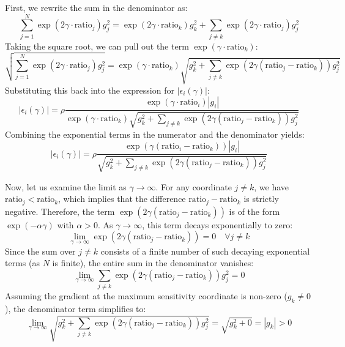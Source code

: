 \documentclass{article}
\theoremstyle{plain}
\theoremstyle{definition}
\theoremstyle{remark}
\begin{document}
First, we rewrite the sum in the denominator as:
\begin{equation}
    \sum_{j=1}^N \exp(2\gamma \cdot \text{ratio}_j) g_j^2 = \exp(2\gamma \cdot \text{ratio}_k) g_k^2 + \sum_{j \neq k} \exp(2\gamma \cdot \text{ratio}_j) g_j^2
\end{equation}
Taking the square root, we can pull out the term $\exp(\gamma \cdot \text{ratio}_k)$:
\begin{equation}
    \sqrt{\sum_{j=1}^N \exp(2\gamma \cdot \text{ratio}_j) g_j^2} = \exp(\gamma \cdot \text{ratio}_k) \sqrt{g_k^2 + \sum_{j \neq k} \exp(2\gamma(\text{ratio}_j - \text{ratio}_k)) g_j^2}
\end{equation}
Substituting this back into the expression for $|\epsilon_i(\gamma)|$:
\begin{equation}
    |\epsilon_i(\gamma)| = \rho \frac{\exp(\gamma \cdot \text{ratio}_i) |g_i|}{\exp(\gamma \cdot \text{ratio}_k) \sqrt{g_k^2 + \sum_{j \neq k} \exp(2\gamma(\text{ratio}_j - \text{ratio}_k)) g_j^2}}
\end{equation}
Combining the exponential terms in the numerator and the denominator yields:
\begin{equation}
    |\epsilon_i(\gamma)| = \rho \frac{\exp(\gamma(\text{ratio}_i - \text{ratio}_k)) |g_i|}{\sqrt{g_k^2 + \sum_{j \neq k} \exp(2\gamma(\text{ratio}_j - \text{ratio}_k)) g_j^2}}
\end{equation}

Now, let us examine the limit as $\gamma \to \infty$. 
For any coordinate $j \neq k$, we have $\text{ratio}_j < \text{ratio}_k$, which implies that the difference $\text{ratio}_j - \text{ratio}_k$ is strictly negative. Therefore, the term $\exp(2\gamma(\text{ratio}_j - \text{ratio}_k))$ is of the form $\exp(-\alpha \gamma)$ with $\alpha > 0$. As $\gamma \to \infty$, this term decays exponentially to zero:
\begin{equation}
    \lim_{\gamma \to \infty} \exp(2\gamma(\text{ratio}_j - \text{ratio}_k)) = 0 \quad \forall j \neq k
\end{equation}
Since the sum over $j \neq k$ consists of a finite number of such decaying exponential terms (as $N$ is finite), the entire sum in the denominator vanishes:
\begin{equation}
    \lim_{\gamma \to \infty} \sum_{j \neq k} \exp(2\gamma(\text{ratio}_j - \text{ratio}_k)) g_j^2 = 0
\end{equation}
Assuming the gradient at the maximum sensitivity coordinate is non-zero ($g_k \neq 0$), the denominator term simplifies to:
\begin{equation}
    \lim_{\gamma \to \infty} \sqrt{g_k^2 + \sum_{j \neq k} \exp(2\gamma(\text{ratio}_j - \text{ratio}_k)) g_j^2} = \sqrt{g_k^2 + 0} = |g_k| > 0
\end{equation}
\end{document}
